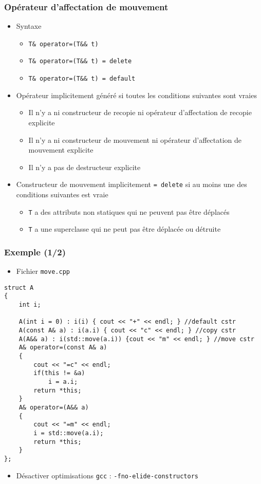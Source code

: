 \begin{frame}
\frametitle{Opérateur d'affectation de mouvement}
\begin{itemize}[<+->]
\item Syntaxe
	\begin{itemize}
	\item \lstinline|T& operator=(T&& t)|
	\item \lstinline|T& operator=(T&& t) = delete|
	\item \lstinline|T& operator=(T&& t) = default|
	\end{itemize}
\item Opérateur implicitement généré si toutes les conditions suivantes sont vraies
	\begin{itemize}
	\item Il n'y a ni constructeur de recopie ni opérateur d'affectation de recopie explicite
	\item Il n'y a ni constructeur de mouvement ni opérateur d'affectation de mouvement explicite
	\item Il n'y a pas de destructeur explicite
	\end{itemize}
\item Constructeur de mouvement implicitement \lstinline|= delete| si au moins une des conditions suivantes est vraie
	\begin{itemize}
	\item \texttt{T} a des attributs non statiques qui ne peuvent pas être déplacés
	\item \texttt{T} a une superclasse qui ne peut pas être déplacée ou détruite
	\end{itemize}
\end{itemize}
\end{frame}

\begin{frame}[containsverbatim]
\frametitle{Exemple (1/2)}
\begin{itemize}
\item Fichier \texttt{move.cpp}
\end{itemize}
\begin{lstlisting}
struct A
{
    int i;
    
    A(int i = 0) : i(i) { cout << "+" << endl; } //default cstr
    A(const A& a) : i(a.i) { cout << "c" << endl; } //copy cstr
    A(A&& a) : i(std::move(a.i)) {cout << "m" << endl; } //move cstr
    A& operator=(const A& a)
    {
        cout << "=c" << endl;
        if(this != &a)
            i = a.i;
        return *this;
    }
    A& operator=(A&& a)
    {
        cout << "=m" << endl;
        i = std::move(a.i);
        return *this;
    }
};
\end{lstlisting}
\begin{itemize}
\item Désactiver optimisations \texttt{gcc} : \texttt{-fno-elide-constructors}
\end{itemize}
\end{frame}

